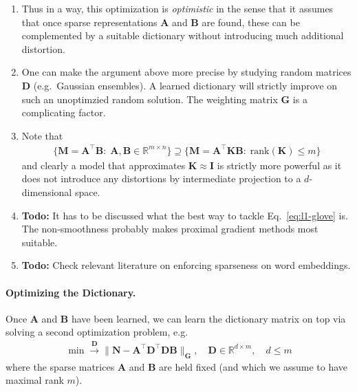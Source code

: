 \documentclass{article}
\renewcommand{\Re}{{\mathbb R}}
\newcommand{\mN}{{\mathbf N}}
\newcommand{\mM}{{\mathbf M}}
\newcommand{\mG}{{\mathbf G}}
\newcommand{\mK}{{\mathbf K}}
\newcommand{\mD}{{\mathbf D}}
\newcommand{\mA}{{\mathbf A}}
\newcommand{\mB}{{\mathbf B}}
\begin{document}
\begin{enumerate}
\item Thus in a way, this optimization is \textit{optimistic} in the sense that it assumes that once sparse representations $\mA$ and $\mB$ are found, these can be complemented by a suitable dictionary without introducing much additional distortion. 
\item One can make the argument above more precise by studying random matrices $\mD$ (e.g.~Gaussian ensembles). A learned dictionary will strictly improve on such an unoptimzied random solution. The weighting matrix $\mG$ is a complicating factor.
\item Note that 
\begin{align}
\{ \mM = \mA^\top \mB : \; \mA, \mB \in \Re^{m \times n} \} 
\supseteq \{ \mM =  \mA^\top \mK \mB: \; \text{rank}(\mK)\le m\}
\end{align}
and clearly a model that approximates $\mK \approx \mathbf I$ is strictly more powerful as it does not introduce any distortions by intermediate projection to a $d$-dimensional space. 
\item \textbf{Todo:} It has to be discussed what the best way to tackle Eq.~\eqref{eq:l1-glove} is. The non-smoothness probably makes proximal gradient methods most suitable.
\item \textbf{Todo:} Check relevant literature on enforcing sparseness on word embeddings. 
\end{enumerate} 

\paragraph{Optimizing the Dictionary.} 

Once $\mA$ and $\mB$ have been learned, we can learn the dictionary matrix on top via solving a second optimization problem, e.g.
\begin{align}
\min \stackrel{\mD}{\longrightarrow} \| \mN -  \mA^\top \mD^\top  \mD \mB\|_{\mG}, \quad \mD \in \Re^{d \times m}, \quad d \le m
\end{align}
where the sparse matrices $\mA$ and $\mB$ are held fixed (and which we assume to have maximal rank $m$).
\end{document}
